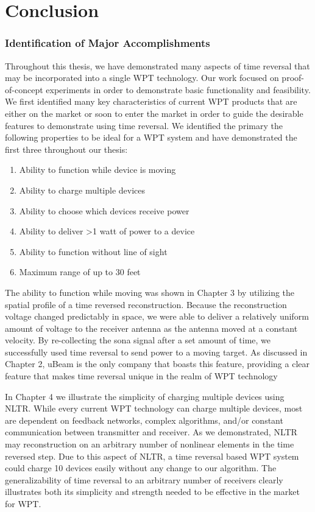 \chapter{Conclusion}

\label{ch:conclusion}

\subsection{Identification of Major Accomplishments}

Throughout this thesis, we have demonstrated many aspects of time reversal that may be incorporated into a single WPT technology. Our work focused on proof-of-concept experiments in order to demonstrate basic functionality and feasibility.  We first identified many key characteristics of current WPT products that are either on the market or soon to enter the market in order to guide the desirable features to demonstrate using time reversal. We identified the primary the following properties to be ideal for a WPT system and have demonstrated the first three throughout our thesis:

\begin{enumerate}
\item Ability to function while device is moving
\item Ability to charge multiple devices 
\item Ability to choose which devices receive power
\item Ability to deliver >1 watt of power to a device
\item Ability to function without line of sight
\item Maximum range of up to 30 feet
\end{enumerate}

The ability to function while moving was shown in Chapter 3 by utilizing the spatial profile of a time reversed reconstruction. Because the reconstruction voltage changed predictably in space, we were able to deliver a relatively uniform amount of voltage to the receiver antenna as the antenna moved at a constant velocity. By re-collecting the sona signal after a set amount of time, we successfully used time reversal to send power to a moving target.  As discussed in Chapter 2, uBeam is the only company that boasts this feature, providing a clear feature that makes time reversal unique in the realm of WPT technology

In Chapter 4 we illustrate the simplicity of charging multiple devices using NLTR. While every current WPT technology can charge multiple devices, most are dependent on feedback networks, complex algorithms, and/or constant communication between transmitter and receiver. As we demonstrated, NLTR may reconstruction on an arbitrary number of nonlinear elements in the time reversed step. Due to this aspect of NLTR, a time reversal based WPT system could charge 10 devices easily without any change to our algorithm. The generalizability of time reversal to an arbitrary number of receivers clearly illustrates both its simplicity and strength needed to be effective in the market for WPT.

